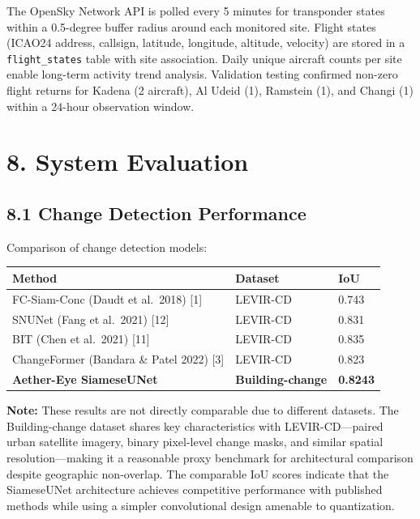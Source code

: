 \documentclass[11pt,a4paper]{article}
\begin{document}
The OpenSky Network API is polled every 5 minutes for transponder states within a 0.5-degree buffer radius around each monitored site. Flight states (ICAO24 address, callsign, latitude, longitude, altitude, velocity) are stored in a \texttt{flight\_states} table with site association. Daily unique aircraft counts per site enable long-term activity trend analysis. Validation testing confirmed non-zero flight returns for Kadena (2 aircraft), Al Udeid (1), Ramstein (1), and Changi (1) within a 24-hour observation window.

\hypertarget{system-evaluation}{%
\section{8. System Evaluation}\label{system-evaluation}}

\hypertarget{change-detection-performance}{%
\subsection{8.1 Change Detection Performance}\label{change-detection-performance}}
 
Comparison of change detection models:
 
\begin{longtable}[]{@{}lll@{}}
\toprule\noalign{}
Method & Dataset & IoU \\
\midrule\noalign{}
\endhead
\bottomrule\noalign{}
\endlastfoot
FC-Siam-Conc (Daudt et al.\ 2018) [1] & LEVIR-CD & 0.743 \\
SNUNet (Fang et al.\ 2021) [12] & LEVIR-CD & 0.831 \\
BIT (Chen et al.\ 2021) [11] & LEVIR-CD & 0.835 \\
ChangeFormer (Bandara \& Patel 2022) [3] & LEVIR-CD & 0.823 \\
\textbf{Aether-Eye SiameseUNet} & \textbf{Building-change} & \textbf{0.8243} \\
\end{longtable}
 
\textbf{Note:} These results are not directly comparable due to different datasets. The Building-change dataset shares key characteristics with LEVIR-CD---paired urban satellite imagery, binary pixel-level change masks, and similar spatial resolution---making it a reasonable proxy benchmark for architectural comparison despite geographic non-overlap. The comparable IoU scores indicate that the SiameseUNet architecture achieves competitive performance with published methods while using a simpler convolutional design amenable to quantization.
 
\end{document}
